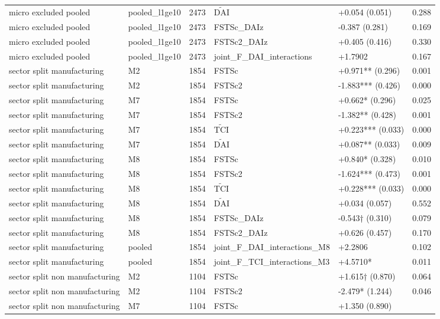 \documentclass[12pt,a4paper]{article}
\begin{document}
\begin{longtable}[]{@{}llllll@{}}
micro excluded pooled & pooled\_l1ge10 & 2473 & \(\tilde{\mathrm{DAI}}\)
& +0.054 (0.051) & 0.288 \\
micro excluded pooled & pooled\_l1ge10 & 2473 & FSTSc\_DAIz & -0.387
(0.281) & 0.169 \\
micro excluded pooled & pooled\_l1ge10 & 2473 & FSTSc2\_DAIz & +0.405
(0.416) & 0.330 \\
micro excluded pooled & pooled\_l1ge10 & 2473 &
joint\_F\_DAI\_interactions & +1.7902 & 0.167 \\
sector split manufacturing & M2 & 1854 & FSTSc & +0.971** (0.296) &
0.001 \\
sector split manufacturing & M2 & 1854 & FSTSc2 & -1.883*** (0.426) &
0.000 \\
sector split manufacturing & M7 & 1854 & FSTSc & +0.662* (0.296) &
0.025 \\
sector split manufacturing & M7 & 1854 & FSTSc2 & -1.382** (0.428) &
0.001 \\
sector split manufacturing & M7 & 1854 & \(\tilde{\mathrm{TCI}}\) &
+0.223*** (0.033) & 0.000 \\
sector split manufacturing & M7 & 1854 & \(\tilde{\mathrm{DAI}}\) &
+0.087** (0.033) & 0.009 \\
sector split manufacturing & M8 & 1854 & FSTSc & +0.840* (0.328) &
0.010 \\
sector split manufacturing & M8 & 1854 & FSTSc2 & -1.624*** (0.473) &
0.001 \\
sector split manufacturing & M8 & 1854 & \(\tilde{\mathrm{TCI}}\) &
+0.228*** (0.033) & 0.000 \\
sector split manufacturing & M8 & 1854 & \(\tilde{\mathrm{DAI}}\) &
+0.034 (0.057) & 0.552 \\
sector split manufacturing & M8 & 1854 & FSTSc\_DAIz & -0.543† (0.310) &
0.079 \\
sector split manufacturing & M8 & 1854 & FSTSc2\_DAIz & +0.626 (0.457) &
0.170 \\
sector split manufacturing & pooled & 1854 &
joint\_F\_DAI\_interactions\_M8 & +2.2806 & 0.102 \\
sector split manufacturing & pooled & 1854 &
joint\_F\_TCI\_interactions\_M3 & +4.5710* & 0.011 \\
sector split non manufacturing & M2 & 1104 & FSTSc & +1.615† (0.870) &
0.064 \\
sector split non manufacturing & M2 & 1104 & FSTSc2 & -2.479* (1.244) &
0.046 \\
sector split non manufacturing & M7 & 1104 & FSTSc & +1.350 (0.890) &

\end{longtable}
\end{document}
